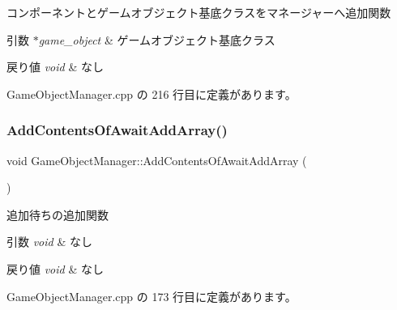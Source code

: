 コンポーネントとゲームオブジェクト基底クラスをマネージャーへ追加関数 


\begin{DoxyParams}{引数}
{\em $\ast$game\+\_\+object} & ゲームオブジェクト基底クラス \\
\hline
\end{DoxyParams}

\begin{DoxyRetVals}{戻り値}
{\em void} & なし \\
\hline
\end{DoxyRetVals}


 Game\+Object\+Manager.\+cpp の 216 行目に定義があります。

\mbox{\label{class_game_object_manager_a783a9d55d566ab8c39e6ed86b3b52a09}} 
\subsubsection{\texorpdfstring{Add\+Contents\+Of\+Await\+Add\+Array()}{AddContentsOfAwaitAddArray()}}
{\footnotesize\ttfamily void Game\+Object\+Manager\+::\+Add\+Contents\+Of\+Await\+Add\+Array (\begin{DoxyParamCaption}{ }\end{DoxyParamCaption})\hspace{0.3cm}{\ttfamily [private]}}



追加待ちの追加関数 


\begin{DoxyParams}{引数}
{\em void} & なし \\
\hline
\end{DoxyParams}

\begin{DoxyRetVals}{戻り値}
{\em void} & なし \\
\hline
\end{DoxyRetVals}


 Game\+Object\+Manager.\+cpp の 173 行目に定義があります。

\mbox{\label{class_game_object_manager_a30e496fe43d48b434da34ade418b4fdb}} 
